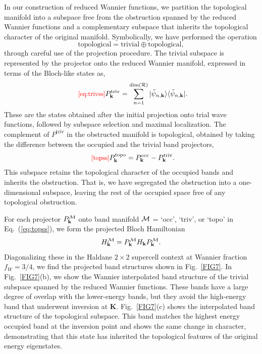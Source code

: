 \documentclass[galley,aps,pra,10pt,amsmath,amssymb,
    superscriptaddress,nofootinbib,longbibliography]{revtex4-2}
\def\Red#1{\textcolor{red}{#1}}
\newcounter{comm}
\newcommand{\eqlab}[1]{\Red{\hbox{\small\;\;[#1]}}\label{eq:#1}}
\newcommand{\eqlab}[1]{\label{eq:#1}}
\newcommand{\eq}[1]{Eq.~(\ref{eq:#1})}
\begin{document}
In our construction of reduced Wannier functions, we partition the topological manifold into a subspace free from the obstruction spanned by the reduced Wannier functions and a complementary subspace that inherits the topological character of the original manifold. Symbolically, we have performed the operation
\begin{equation}
    \text{topological} = \text{trivial} \oplus \text{topological},
\end{equation}
through careful use of the projection procedure. The trivial subspace is represented by the projector onto the reduced Wannier manifold, expressed in terms of the Bloch-like states as, 
\begin{equation}
\eqlab{eq:trivss}
    P^{\text{triv}}_{\mathbf{k}} = \sum_{n=1}^{\dim({\mathcal{R}})} |\tilde{\psi}_{n,\mathbf{k}} \rangle \langle \tilde{\psi}_{n,\mathbf{k}}|.
\end{equation}
These are the states obtained after the initial projection onto trial wave functions, followed by subspace selection and maximal localization. The complement of $P^{\text{triv}}$ in the obstructed manifold is topological, obtained by taking the difference between the occupied and the trivial band projectors, 
\begin{equation}
\eqlab{topss}
P^{\text{topo}}_{\mathbf{k}}= P^{\text{occ}}_{\mathbf{k}} - P^{\text{triv}}_{\mathbf{k}}.
\end{equation}
This subspace retains the topological character of the occupied bands and inherits the obstruction. That is, we have segregated the obstruction into a one-dimensional subspace, leaving the rest of the occupied space free of any topological obstruction.

\def\ssp{{\cal M}} 
For each projector $P_{\mathbf{k}}^\ssp$ onto band manifold $\ssp$ = `occ', `triv', or `topo' in \eq{topss}, we form the projected Bloch Hamiltonian
\begin{equation}
H^\ssp_{\mathbf{k}} = P^\ssp_{\mathbf{k}} H_{\mathbf{k}} P^\ssp_{\mathbf{k}}.
\end{equation}
Diagonalizing these in the Haldane $2\times2$ supercell context at Wannier fraction $f_W=3/4$, we find the projected band structures shown in Fig.~\ref{FIG7}. In Fig.~\ref{FIG7}(b), we show the Wannier interpolated band structure of the trivial subspace spanned by the reduced Wannier functions. These bands have a large degree of overlap with the lower-energy bands, but they avoid the high-energy band that underwent inversion at $\mathbf{K}$. Fig.~\ref{FIG7}(c) shows the interpolated band structure of the topological subspace. This band matches the highest energy occupied band at the inversion point and shows the same change in character, demonstrating that this state has inherited the topological features of the original energy eigenstates.  
\end{document}
